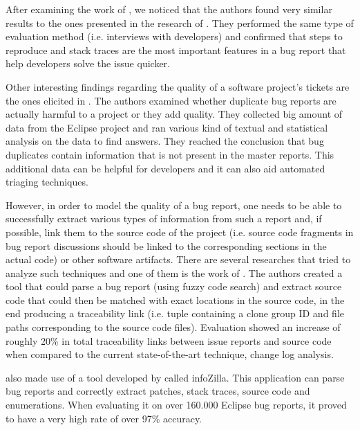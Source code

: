 \documentclass{mprop}
\begin{document}
After examining the work of \citet{bettenburg2007quality}, we noticed that
the authors found very similar results to the ones presented in the research of \citet{bettenburg2008makes}. 
They performed the same type of evaluation method (i.e. 
interviews with developers) and confirmed that steps to reproduce and stack traces
are the most important features in a bug report that help developers solve the
issue quicker.

Other interesting findings regarding the quality of a software project's tickets
are the ones elicited in \citet{bettenburg2008duplicate}. The authors examined
whether duplicate bug reports are actually harmful to a project or they add 
quality. They collected big amount of data from the Eclipse project and ran
various kind of textual and statistical analysis on the data to find answers.
They reached the conclusion that bug duplicates contain information that is not
present in the master reports. This additional data can be helpful for developers
and it can also aid automated triaging techniques.

However, in order to model the quality of a bug report, one needs to be able to
successfully extract various types of information from such a report and, if 
possible, link them to the source code of the project (i.e. source code fragments
in bug report discussions should be linked to the corresponding sections in the 
actual code) or other software artifacts. There are several researches that tried 
to analyze such techniques and one of them is the work of 
\citet{bettenburg2012using}. The authors created a tool that could parse a bug 
report (using fuzzy code search) and extract source code that could then be
matched with exact locations in the source code, in the end producing a 
traceability link (i.e. tuple containing a clone group ID and file paths 
corresponding to the source code files). Evaluation showed an increase of
roughly 20\% in total traceability links between issue reports and source code 
when compared to the current state-of-the-art technique, change log analysis.

\citet{bettenburg2012using} also made use of a tool developed by 
\citet{bettenburg2008extracting} called infoZilla. This application can
parse bug reports and correctly extract patches, stack traces, source code and
enumerations. When evaluating it on over 160.000 Eclipse bug reports, it proved to 
have a very high rate of over 97\% accuracy.
\end{document}
